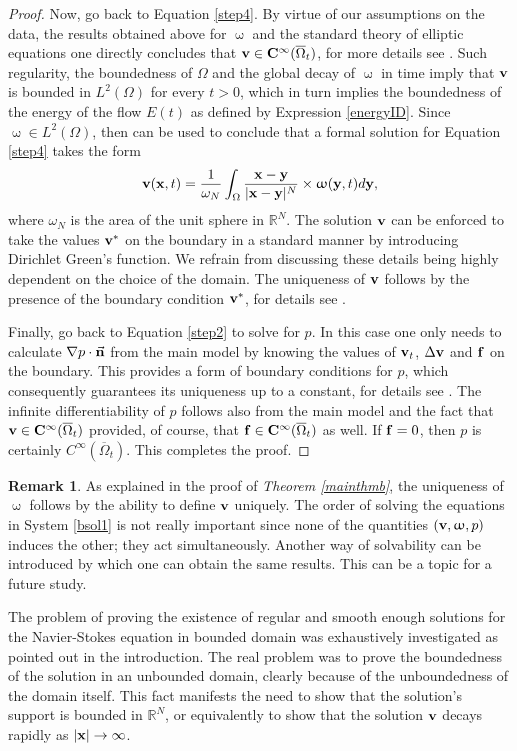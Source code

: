 \documentclass[a4 paper, 11pt,twoside]{article}
\newcommand{\Bf}[1]{{\bf{#1}}}
\newcommand{\V}{{\bf{v}}}
\newcommand{\X}{{\bf{x}}}
\newcommand{\Y}{{\bf{y}}}
\newcommand{\0}{\Bf{0}}
\newcommand{\F}{{\bf{f}}}
\theoremstyle{definition}
\newtheorem*{rem}{Remark}
\begin{document}
\begin{proof}
Now, go back to Equation \eqref{step4}. By virtue of our assumptions on the data, the results obtained above for $\upomega$ and the standard theory of elliptic equations one directly concludes that $\V\in \Bf{C}^\infty(\overline{\Omega}_t)$, for more details see \cite[pp. 326-343]{evans}. Such regularity, the boundedness of $\Omega$ and the global decay of $\upomega$ in time imply that $\V$ is bounded in $L^2(\Omega)$ for every $t>0$, which in turn implies the boundedness of the energy of the flow $E(t)$ as defined by Expression \eqref{energyID}. Since $\upomega\in L^2(\Omega)$, then \cite[Proposition 2.16]{majda} can be used to conclude that a formal solution for Equation \eqref{step4} takes the form
\begin{equation}
\V(\X,t)=\frac{1}{\omega_N}\int_\Omega\frac{\X-\Y}{|\X-\Y|^N}\times\upomega(\Y,t)d\Y,
\label{vsol1}
\end{equation}
where $\omega_N$ is the area of the unit sphere in $\mathbb{R}^N$. The solution $\V$ can be enforced to take the values $\V^*$ on the boundary in a standard manner by introducing Dirichlet Green's function. We refrain from discussing these details being highly dependent on the choice of the domain. The uniqueness of $\V$ follows by the presence of the boundary condition $\V^*$, for details see \cite{evans,fritz}.

Finally, {\color{black}go back} to Equation \eqref{step2} to solve for $p$. {In this case one only needs to calculate $\nabla p\cdot\vec{\Bf{n}}$ from the main model by knowing the values of $\V_t$, $\Delta \V$ and $\F$ on the boundary. This provides a form of boundary conditions for $p$, which consequently guarantees its uniqueness up to a constant, for details see \cite{fritz}. {\color{black}The infinite differentiability of $p$ follows also from the main model and the fact that $\V\in\Bf{C}^\infty(\overline{\Omega}_t)$ provided, of course, that $\F\in\Bf{C}^\infty(\overline{\Omega}_t)$ as well. If $\F=0$, then $p$ is certainly $C^\infty(\overline{\Omega}_t)$. This completes the proof.}}
\end{proof}
\begin{rem}
As explained in the proof of {\it Theorem \ref{mainthmb}}, the uniqueness of $\upomega$ follows by the ability to define $\V$ uniquely. The order of solving the equations in System \eqref{bsol1} is not really important since none of the quantities $(\V,\upomega,p)$ induces the other; they act simultaneously. Another way of solvability can be introduced by which one can obtain the same results. This can be a topic for a future study.
\end{rem}
The problem of proving the existence of regular and smooth enough solutions for the Navier-Stokes equation in bounded domain was exhaustively investigated as pointed out in the introduction. The real problem was to prove the boundedness of the solution in an unbounded domain, clearly because of the unboundedness of the domain itself. This fact manifests the need to show that the solution's support is bounded in $\mathbb{R}^N$, or equivalently to show that the solution $\V$ decays rapidly as $|\X|\rightarrow\infty$.
\end{document}
